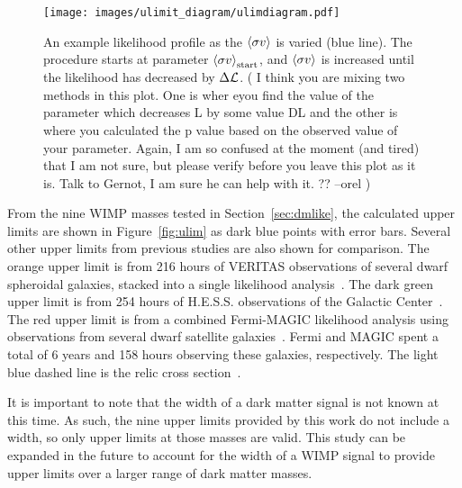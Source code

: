 %
%
%
%

\begin{figure}[bt]
  \centering
  \texttt{[image: images/ulimit\_diagram/ulimdiagram.pdf]}
  \caption[Upper Limit Calculation]{
    An example likelihood profile as the $\left \langle \sigma v \right \rangle$ is varied (blue line).
    The procedure starts at parameter $\left \langle \sigma v \right \rangle_{\mathrm{start}}$, and $\left \langle \sigma v \right \rangle$ is increased until the likelihood has decreased by $\Delta{}\mathcal{L}$.
    {\color{red}(
      I think you are mixing two methods in this plot.
      One is wher eyou find the value of the parameter which decreases L by some value DL and the other is where you calculated the p value based on the observed value of your parameter.
      Again, I am so confused at the moment (and tired) that I am not sure, but please verify before you leave this plot as it is.
      Talk to Gernot, I am sure he can help with it. ?? --orel
    )}
  }
  \label{fig:ulimitdiag}
\end{figure}



From the nine WIMP masses tested in Section~\ref{sec:dmlike}, the calculated upper limits are shown in Figure~\ref{fig:ulim} as dark blue points with error bars.
Several other upper limits from previous studies are also shown for comparison.
The orange upper limit is from 216 hours of VERITAS observations of several dwarf spheroidal galaxies, stacked into a single likelihood analysis~\cite{verdsphul}.
The dark green upper limit is from 254 hours of H.E.S.S. observations of the Galactic Center~\cite{hessgcul}.
The red upper limit is from a combined Fermi-MAGIC likelihood analysis using observations from several dwarf satellite galaxies~\cite{fermagicul}.
Fermi and MAGIC spent a total of 6 years and 158 hours observing these galaxies, respectively.
The light blue dashed line is the relic cross section~\cite{updatedWIMPRelicCrossSection}.

It is important to note that the width of a dark matter signal is not known at this time.
As such, the nine upper limits provided by this work do not include a width, so only upper limits at those masses are valid.
This study can be expanded in the future to account for the width of a WIMP signal to provide upper limits over a larger range of dark matter masses.

